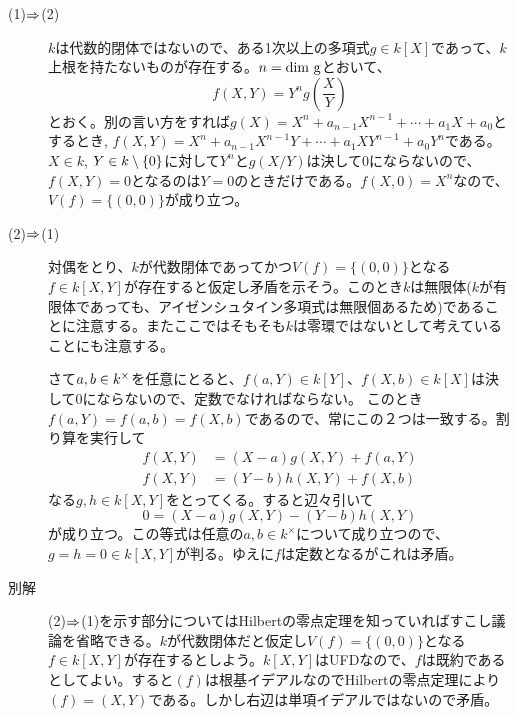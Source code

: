 
\begin{sol}${}$
\begin{description}
  \item[(1)$\Rightarrow$(2)] $k$は代数的閉体ではないので、ある1次以上の多項式$g \in k[X]$であって、$k$上根を持たないものが存在する。$n = \rm{dim}\ g$とおいて、
  \[
  f(X,Y)= Y^n g \left(\frac{X}{Y} \right)
  \]
  とおく。別の言い方をすれば$g(X)= X^n + a_{n-1}X^{n-1} + \cdots + a_1X + a_0$とするとき, $f(X,Y)= X^n + a_{n-1}X^{n-1}Y + \cdots + a_1XY^{n-1} + a_0Y^n$である。$X \in k$, $Y \in k \setminus \{0\}$に対して$Y^n$と$g(X/Y)$は決して0にならないので、$f(X,Y)=0$となるのは$Y=0$のときだけである。$f(X,0)=X^n$なので、
  $V(f) =\{ (0,0)\}$が成り立つ。
  \item[(2)$\Rightarrow$(1)] 対偶をとり、$k$が代数閉体であってかつ$V(f) =\{ (0,0)\}$となる$f \in k[X,Y]$が存在すると仮定し矛盾を示そう。このとき$k$は無限体($k$が有限体であっても、アイゼンシュタイン多項式は無限個あるため)であることに注意する。またここではそもそも$k$は零環ではないとして考えていることにも注意する。

  さて$a,b \in k^{\times}$を任意にとると、$f(a,Y) \in k[Y]$、$f(X,b) \in k[X]$は決して0にならないので、定数でなければならない。
  このとき$f(a,Y)=f(a,b)=f(X,b)$であるので、常にこの２つは一致する。割り算を実行して
  \begin{align*}
    f(X,Y) &= (X-a)g(X,Y) + f(a,Y) \\
    f(X,Y) & =(Y-b)h(X,Y)+f(X,b)
  \end{align*}
  なる$g, h \in k[X,Y]$をとってくる。すると辺々引いて
  \[
  0 = (X-a)g(X,Y) - (Y-b)h(X,Y)
  \]
  が成り立つ。この等式は任意の$a,b \in k^{\times}$について成り立つので、$g=h=0 \in k[X,Y]$が判る。ゆえに$f$は定数となるがこれは矛盾。
  \item[別解] (2)$\Rightarrow$(1)を示す部分についてはHilbertの零点定理を知っていればすこし議論を省略できる。$k$が代数閉体だと仮定し$V(f) =\{ (0,0)\}$となる$f \in k[X,Y]$が存在するとしよう。$k[X,Y]$はUFDなので、$f$は既約であるとしてよい。すると$(f)$は根基イデアルなのでHilbertの零点定理により$(f) = (X,Y)$である。しかし右辺は単項イデアルではないので矛盾。
\end{description}
\end{sol}


